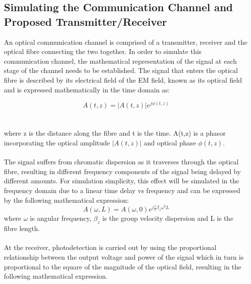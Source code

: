 \subsection{Simulating the Communication Channel and Proposed Transmitter/Receiver}

An optical communication channel is comprised of a transmitter, receiver and the optical fibre connecting the two together. In order to simulate this communication channel, the mathematical representation of the signal at each stage of the channel needs to be established. The signal that enters the optical fibre is described by its electrical field of the EM field, known as its optical field and is expressed mathematically in the time domain as: 

\begin{equation}
    A(t, z) = |A(t,z)|e^{j\phi(t,z)}
\end{equation}
\\
\\
where z is the distance along the fibre and t is the time. A(t,z) is a phasor incorporating the optical amplitude $|A(t,z)|$ and optical phase $\phi(t,z)$. 
\\
\\
The signal suffers from chromatic dispersion as it traverses through the optical fibre, resulting in different frequency components of the signal being delayed by different amounts. For simulation simplicity, this effect will be simulated in the frequency domain due to a linear time delay vs frequency and can be expressed by the following mathematical expression:
\begin{equation}\label{opticalField}
    A(\omega,L) = A(\omega,0)e^{j\frac{1}{2}\beta_z\omega^2L}
\end{equation}
where $\omega$ is angular frequency, $\beta_z$ is the group velocity dispersion and L is the fibre length.
\\
\\
At the receiver, photodetection is carried out by using the proportional relationship between the output voltage and power of the signal which in turn is proportional to the square of the magnitude of the optical field, resulting in the following mathematical expression.

